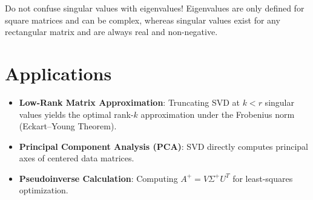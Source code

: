 \documentclass[mode=handout, palette=nord, fontsize=11pt]{modernclassnotes}
\begin{document}
\begin{warning}
Do not confuse singular values with eigenvalues! Eigenvalues are only defined for square matrices and can be complex, whereas singular values exist for any rectangular matrix and are always real and non-negative.
\end{warning}

\section{Applications}

\begin{takeaways}
\begin{itemize}
    \item \textbf{Low-Rank Matrix Approximation}: Truncating SVD at $k < r$ singular values yields the optimal rank-$k$ approximation under the Frobenius norm (Eckart--Young Theorem).
    \item \textbf{Principal Component Analysis (PCA)}: SVD directly computes principal axes of centered data matrices.
    \item \textbf{Pseudoinverse Calculation}: Computing $A^+ = V \Sigma^+ U^T$ for least-squares optimization.
\end{itemize}
\end{takeaways}
\end{document}
